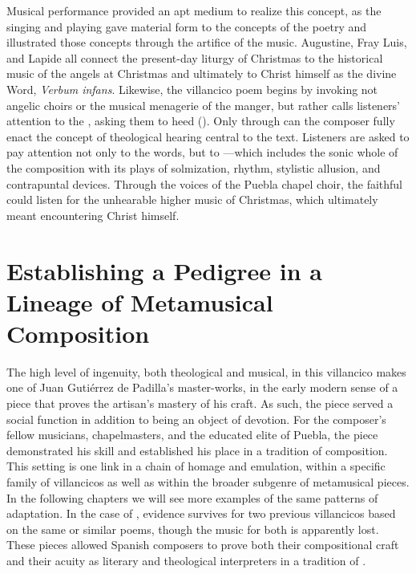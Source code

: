 Musical performance provided an apt medium to realize this concept, as the
singing and playing gave material form to the concepts of the poetry and
illustrated those concepts through the artifice of the music.
Augustine, Fray Luis, and Lapide all connect the present-day liturgy of
Christmas to the historical music of the angels at Christmas and ultimately to
Christ himself as the divine Word, \emph{Verbum infans}.
Likewise, the villancico poem begins by invoking not angelic choirs or the
musical menagerie of the manger, but rather calls listeners' attention to the
, asking them to heed 
().
Only through  can the composer fully enact
the concept of theological hearing central to the text.
Listeners are asked to pay attention not only to the words, but to ---which includes the sonic whole of the composition with its plays of
solmization, rhythm, stylistic allusion, and contrapuntal devices.
Through the voices of the Puebla chapel choir, the faithful could listen for the
unhearable higher music of Christmas, which ultimately meant encountering Christ
himself.

\section{Establishing a Pedigree in a Lineage of Metamusical Composition}

The high level of ingenuity, both theological and musical, in this villancico
makes  one of Juan Gutiérrez de Padilla's
master-works, in the early modern sense of a piece that proves the artisan's
mastery of his craft.
As such, the piece served a social function in addition to being an object of
devotion.
For the composer's fellow musicians, chapelmasters, and the educated elite of
Puebla, the piece demonstrated his skill and established his place in a
tradition of composition.
This setting is one link in a chain of homage and emulation, within a specific
family of villancicos as well as within the broader subgenre of metamusical
pieces.
In the following chapters we will see more examples of the same patterns of
adaptation.
In the case of , evidence survives for two
previous villancicos based on the same or similar poems, though the music for
both is apparently lost.
These pieces allowed Spanish composers to prove both their compositional craft
and their acuity as literary and theological interpreters in a tradition of
.

